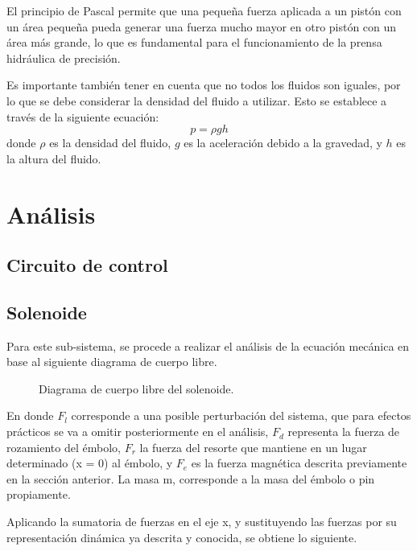 \documentclass[journal]{IEEEtran}
\begin{document}
El principio de Pascal permite que una pequeña fuerza aplicada a un pistón con un área pequeña pueda generar una fuerza mucho mayor en otro pistón con un área más grande, lo que es fundamental para el funcionamiento de la prensa hidráulica de precisión.

Es importante también tener en cuenta que no todos los fluidos son iguales, por lo que se debe considerar la densidad del fluido a utilizar. Esto se establece a través de la siguiente ecuación:
\begin{equation}
    p = \rho g h
\end{equation}
donde $\rho$ es la densidad del fluido, $g$ es la aceleración debido a la gravedad, y $h$ es la altura del fluido.
\section{Análisis}

\subsection{Circuito de control}

\subsection{Solenoide}
Para este sub-sistema, se procede a realizar el análisis de la ecuación mecánica en base al 
siguiente diagrama de cuerpo libre. 

\begin{figure}[H]
  \centering
   
  \caption{Diagrama de cuerpo libre del solenoide.}
  \label{fig:diagrama_cuerpolibre_solenoide}
\end{figure}

En donde $F_l$ corresponde a una posible perturbación del sistema, que para efectos prácticos se va a omitir posteriormente
en el análisis, $F_d$ representa la fuerza de rozamiento del émbolo, $F_r$ la fuerza del resorte que mantiene en un lugar
determinado (x = 0) al émbolo, y $F_e$ es la fuerza magnética descrita previamente en la sección anterior. La masa m, corresponde
a la masa del émbolo o pin propiamente.

Aplicando la sumatoria de fuerzas en el eje x, y sustituyendo las fuerzas por su representación dinámica ya descrita y conocida, 
se obtiene lo siguiente.
\end{document}
